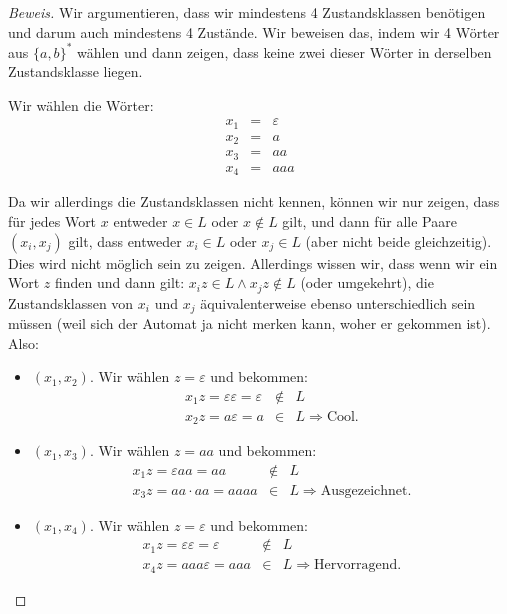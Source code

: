 \documentclass[11pt]{article} %
\theoremstyle{definition}
\begin{document}
\begin{proof}[Beweis]
Wir argumentieren, dass wir mindestens 4 Zustandsklassen benötigen und darum auch mindestens 4 Zustände. Wir beweisen das, indem wir 4 Wörter aus $\{a,b\}^*$ wählen und dann zeigen, dass keine zwei dieser Wörter in derselben Zustandsklasse liegen.

Wir wählen die Wörter:
\begin{eqnarray*}
x_1 &=& \varepsilon \\
x_2 &=& a \\
x_3 &=& aa \\
x_4 &=& aaa
\end{eqnarray*}

Da wir allerdings die Zustandsklassen nicht kennen, können wir nur zeigen, dass für jedes Wort $x$ entweder $x \in L$ oder $x \notin L$ gilt, und dann für alle Paare $(x_i, x_j)$ gilt, dass entweder $x_i \in L$ oder $x_j \in L$ (aber nicht beide gleichzeitig). Dies wird nicht möglich sein zu zeigen. Allerdings wissen wir, dass wenn wir ein Wort $z$ finden und dann gilt: $x_iz \in L \land x_jz \notin L$ (oder umgekehrt), die Zustandsklassen von $x_i$ und $x_j$ äquivalenterweise ebenso unterschiedlich sein müssen (weil sich der Automat ja nicht merken kann, woher er gekommen ist). Also:

\begin{itemize}

\item $(x_1, x_2)$. Wir wählen $z = \varepsilon$ und bekommen:
\begin{eqnarray*}
x_1z = \varepsilon\varepsilon = \varepsilon &\notin& L \\
x_2z = a\varepsilon = a &\in& L \Rightarrow \textrm{Cool.}
\end{eqnarray*}
\item $(x_1, x_3)$. Wir wählen $z = aa$ und bekommen:
\begin{eqnarray*}
x_1z = \varepsilon aa = aa &\notin& L \\
x_3z = aa\cdot aa = aaaa &\in& L \Rightarrow \textrm{Ausgezeichnet.} 
\end{eqnarray*}

\item $(x_1, x_4)$. Wir wählen $z = \varepsilon$ und bekommen:
\begin{eqnarray*}
x_1z = \varepsilon\varepsilon = \varepsilon &\notin& L \\
x_4z = aaa\varepsilon = aaa &\in& L \Rightarrow \textrm{Hervorragend.} 
\end{eqnarray*}


\end{itemize}
\end{proof}
\end{document}
